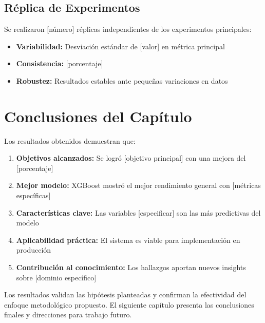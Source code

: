 \subsection{Réplica de Experimentos}

Se realizaron [número] réplicas independientes de los experimentos principales:

\begin{itemize}
    \item \textbf{Variabilidad:} Desviación estándar de [valor] en métrica principal
    \item \textbf{Consistencia:} [porcentaje]%
    \item \textbf{Robustez:} Resultados estables ante pequeñas variaciones en datos
\end{itemize}

\section{Conclusiones del Capítulo}

Los resultados obtenidos demuestran que:

\begin{enumerate}
    \item \textbf{Objetivos alcanzados:} Se logró [objetivo principal] con una mejora del [porcentaje]%
    
    \item \textbf{Mejor modelo:} XGBoost mostró el mejor rendimiento general con [métricas específicas]
    
    \item \textbf{Características clave:} Las variables [especificar] son las más predictivas del modelo
    
    \item \textbf{Aplicabilidad práctica:} El sistema es viable para implementación en producción
    
    \item \textbf{Contribución al conocimiento:} Los hallazgos aportan nuevos insights sobre [dominio específico]
\end{enumerate}

Los resultados validan las hipótesis planteadas y confirman la efectividad del enfoque metodológico propuesto. El siguiente capítulo presenta las conclusiones finales y direcciones para trabajo futuro.

